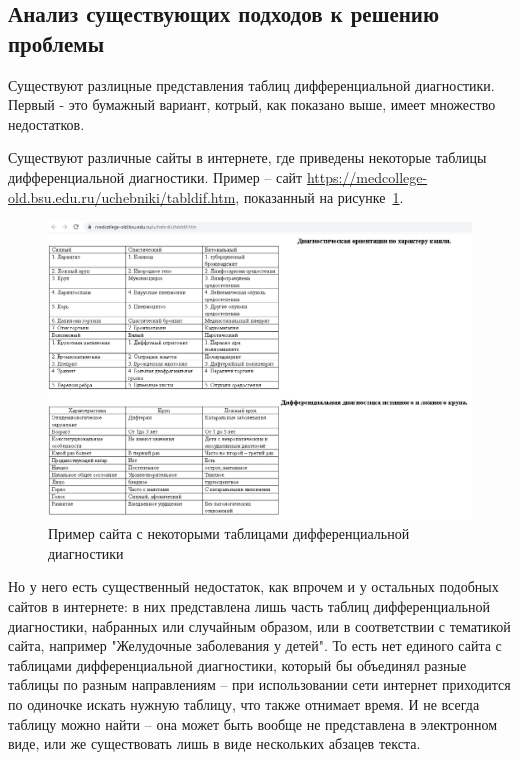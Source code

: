 \subsection{Анализ существующих подходов к решению проблемы}

Существуют разлицные представления таблиц дифференциальной диагностики. Первый - это бумажный вариант, котрый, как показано выше, имеет множество недостатков.

Существуют различные сайты в интернете, где приведены некоторые таблицы дифференциальной диагностики. Пример --  сайт \url{https://medcollege-old.bsu.edu.ru/uchebniki/tabldif.htm}, показанный на рисунке~\ref{fig:tab2}\cite{medcollege}.

\begin{figure}
  \includegraphics[scale=0.5]{src/extab1.png}
  \caption{Пример сайта с некоторыми таблицами дифференциальной диагностики}
  \label{fig:tab2}
\end{figure}

Но у него есть существенный недостаток, как впрочем и у остальных подобных сайтов в интернете: в них представлена лишь часть таблиц дифференциальной диагностики, набранных или случайным образом, или в соответствии с тематикой сайта, например "Желудочные заболевания у детей". То есть нет единого сайта с таблицами дифференциальной диагностики, который бы объединял разные таблицы по разным направлениям -- при использовании сети интернет приходится по одиночке искать нужную таблицу, что также отнимает время. И не всегда таблицу можно найти -- она может быть вообще не представлена в электронном виде, или же существовать лишь в виде нескольких абзацев текста.


